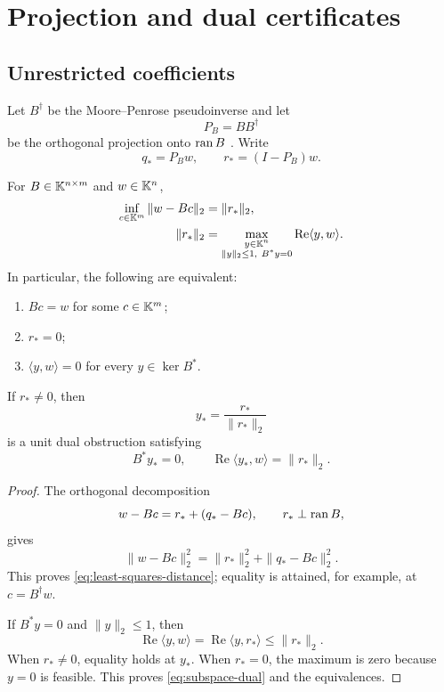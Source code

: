\section{Projection and dual certificates}
\label{sec:dual-certificates}

\subsection{Unrestricted coefficients}

Let \(B^\dagger\) be the Moore--Penrose pseudoinverse and let
\[
 P_B=BB^\dagger
\]
be the orthogonal projection onto \(\operatorname{ran} B\)
\citep{GolubVanLoan2013}.  Write
\begin{equation}
 q_*=P_Bw,\qquad
 r_*=(I-P_B)w.
 \label{eq:subspace-projection}
\end{equation}

\begin{theorem}
\label{thm:subspace-certificate}
For \(B\in\mathbb K^{n\times m}\) and \(w\in\mathbb K^n\),
\begin{align}
 \inf_{c\in\mathbb K^m}\|w-Bc\|_2
 &=\|r_*\|_2,
 \label{eq:least-squares-distance}\\
 \|r_*\|_2
 &=
 \max_{\substack{y\in\mathbb K^n\\
                  \|y\|_2\le1,\ B^*y=0}}
 \operatorname{Re}\langle y,w\rangle.
 \label{eq:subspace-dual}
\end{align}
In particular, the following are equivalent:
\begin{enumerate}[label=(\roman*),leftmargin=2.2em]
\item \(Bc=w\) for some \(c\in\mathbb K^m\);
\item \(r_*=0\);
\item \(\langle y,w\rangle=0\) for every \(y\in\ker B^*\).
\end{enumerate}
If \(r_*\ne0\), then
\[
 y_*=\frac{r_*}{\|r_*\|_2}
\]
is a unit dual obstruction satisfying
\[
 B^*y_*=0,\qquad
 \operatorname{Re}\langle y_*,w\rangle=\|r_*\|_2.
\]
\end{theorem}

\begin{proof}
The orthogonal decomposition
\[
 w-Bc=r_*+(q_*-Bc),
\qquad
 r_*\perp\operatorname{ran} B,
\]
gives
\[
 \|w-Bc\|_2^2
 =
 \|r_*\|_2^2+\|q_*-Bc\|_2^2.
\]
This proves \eqref{eq:least-squares-distance}; equality is attained,
for example, at \(c=B^\dagger w\).

If \(B^*y=0\) and \(\|y\|_2\le1\), then
\[
 \operatorname{Re}\langle y,w\rangle
 =
 \operatorname{Re}\langle y,r_*\rangle
 \le\|r_*\|_2.
\]
When \(r_*\ne0\), equality holds at \(y_*\).  When \(r_*=0\), the
maximum is zero because \(y=0\) is feasible.  This proves
\eqref{eq:subspace-dual} and the equivalences.
\end{proof}

